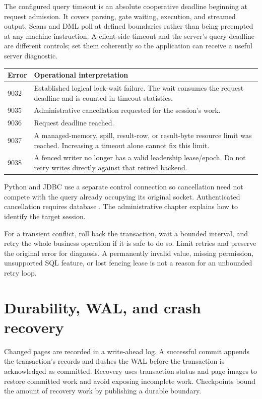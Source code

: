 The configured query timeout is an absolute cooperative deadline beginning
at request admission. It covers parsing, gate waiting, execution, and
streamed output. Scans and DML poll at defined boundaries rather than being
preempted at any machine instruction. A client-side timeout and the server's
query deadline are different controls; set them coherently so the application
can receive a useful server diagnostic.

\begin{longtable}{p{.15\linewidth}p{.78\linewidth}}
\toprule
Error & Operational interpretation \\
\midrule
\endhead
9032 & Established logical lock-wait failure. The wait consumes the request
deadline and is counted in timeout statistics. \\
9035 & Administrative cancellation requested for the session's work. \\
9036 & Request deadline reached. \\
9037 & A managed-memory, spill, result-row, or result-byte resource limit was
reached. Increasing a timeout alone cannot fix this limit. \\
9038 & A fenced writer no longer has a valid leadership lease/epoch. Do not
retry writes directly against that retired backend. \\
\bottomrule
\end{longtable}

Python  and JDBC  use a
separate control connection so cancellation need not compete with the query
already occupying its original socket. Authenticated cancellation requires
database . The administrative chapter explains how to identify
the target session.

For a transient conflict, roll back the transaction, wait a bounded interval,
and retry the whole business operation if it is safe to do so. Limit retries
and preserve the original error for diagnosis. A permanently invalid value,
missing permission, unsupported SQL feature, or lost fencing lease is not a
reason for an unbounded retry loop.

\section{Durability, WAL, and crash recovery}

Changed pages are recorded in a write-ahead log. A successful commit appends
the transaction's records and flushes the WAL before the transaction is
acknowledged as committed. Recovery uses transaction status and page images
to restore committed work and avoid exposing incomplete work. Checkpoints
bound the amount of recovery work by publishing a durable boundary.

